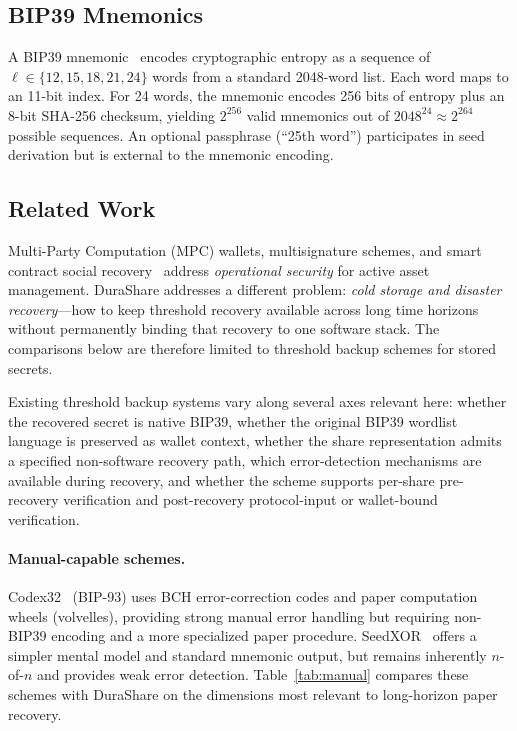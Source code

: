 \documentclass[11pt]{article}
\begin{document}
\subsection{BIP39 Mnemonics}

A BIP39 mnemonic~\cite{bip39} encodes cryptographic entropy as a sequence of $\ell \in \{12, 15, 18, 21, 24\}$ words from a standard 2048-word list. Each word maps to an 11-bit index. For 24 words, the mnemonic encodes 256 bits of entropy plus an 8-bit SHA-256 checksum, yielding $2^{256}$ valid mnemonics out of $2048^{24} \approx 2^{264}$ possible sequences. An optional passphrase (``25th word'') participates in seed derivation but is external to the mnemonic encoding.

\subsection{Related Work}

Multi-Party Computation (MPC) wallets, multisignature schemes, and smart contract social recovery~\cite{buterin} address \emph{operational security} for active asset management. DuraShare addresses a different problem: \emph{cold storage and disaster recovery}---how to keep threshold recovery available across long time horizons without permanently binding that recovery to one software stack. The comparisons below are therefore limited to threshold backup schemes for stored secrets.

Existing threshold backup systems vary along several axes relevant here: whether the recovered secret is native BIP39, whether the original BIP39 wordlist language is preserved as wallet context, whether the share representation admits a specified non-software recovery path, which error-detection mechanisms are available during recovery, and whether the scheme supports per-share pre-recovery verification and post-recovery protocol-input or wallet-bound verification.

\paragraph{Manual-capable schemes.} Codex32~\cite{codex32} (BIP-93) uses BCH error-correction codes and paper computation wheels (volvelles), providing strong manual error handling but requiring non-BIP39 encoding and a more specialized paper procedure. SeedXOR~\cite{seedxor} offers a simpler mental model and standard mnemonic output, but remains inherently $n$-of-$n$ and provides weak error detection. Table~\ref{tab:manual} compares these schemes with DuraShare on the dimensions most relevant to long-horizon paper recovery.
\end{document}
